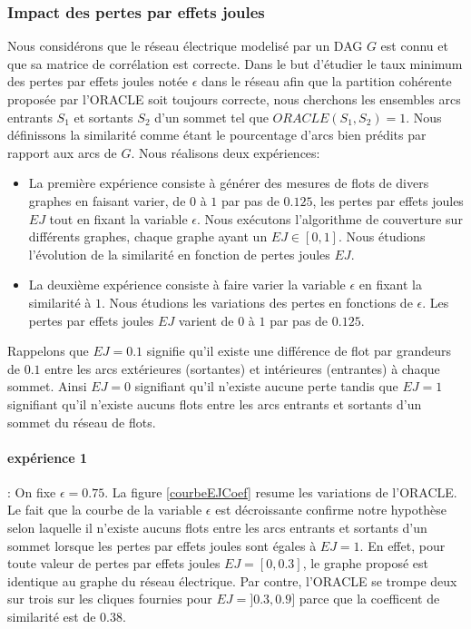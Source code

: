 \subsubsection{Impact des pertes par effets joules}
Nous consid\'erons que le r\'eseau \'electrique modelis\'e par un DAG $G$ est connu et que sa matrice de corr\'elation est correcte. 
Dans le but d'\'etudier le taux minimum des pertes par effets joules not\'ee $\epsilon$ dans le r\'eseau afin que la partition coh\'erente propos\'ee par  l'ORACLE soit toujours correcte, 
nous cherchons les ensembles arcs entrants $S_1$ et sortants $S_2$ d'un sommet tel que $ORACLE(S_1, S_2) = 1$.
Nous d\'efinissons la similarit\'e comme \'etant le pourcentage d'arcs bien pr\'edits par rapport aux arcs de $G$. 
Nous r\'ealisons deux exp\'eriences: 
\begin{itemize}
\item La premi\`ere exp\'erience consiste \`a g\'en\'erer des mesures de flots de divers graphes en faisant varier, de $0$ \`a $1$ par pas de $0.125$, les pertes par effets joules $EJ$ tout en fixant la variable $\epsilon$. Nous ex\'ecutons l'algorithme de couverture sur diff\'erents graphes, chaque graphe ayant un $EJ \in [0,1]$. Nous \'etudions l'\'evolution de la  similarit\'e en fonction de pertes joules $EJ$. 

\item La deuxi\`eme exp\'erience consiste \`a faire varier la variable $\epsilon$ en fixant la similarit\'e \`a $1$.  Nous \'etudions les variations des pertes en fonctions de $\epsilon$.  Les pertes par effets joules $EJ$ varient  de $0$ \`a $1$ par pas de $0.125$. 

\end{itemize}
Rappelons que $EJ=0.1$ signifie qu'il existe une diff\'erence de flot par grandeurs de $0.1$ entre les arcs ext\'erieures (sortantes) et int\'erieures (entrantes) \`a chaque sommet. Ainsi $EJ=0$ signifiant qu'il n'existe aucune perte tandis que  $EJ=1$ signifiant qu'il n'existe aucuns flots entre les arcs entrants et sortants d'un sommet du r\'eseau de flots.
\paragraph{exp\'erience 1} :
On fixe  $\epsilon=0.75$. 
La figure \ref{courbeEJCoef} resume les variations de l'ORACLE. 
Le fait que la courbe de la variable $\epsilon$ est d\'ecroissante confirme notre hypoth\`ese selon laquelle il n'existe aucuns flots entre les arcs entrants et sortants d'un sommet lorsque les pertes par effets joules sont \'egales \`a $EJ = 1$. En effet, pour toute valeur de pertes par effets joules  $EJ=[0,0.3]$, le graphe propos\'e est identique au graphe du r\'eseau \'electrique. Par contre, l'ORACLE se trompe deux sur trois sur les cliques fournies pour $EJ = ]0.3,0.9]$ parce que la coefficent de similarit\'e est de $0.38$. 


